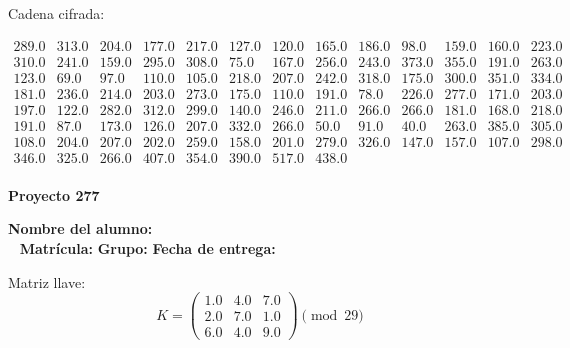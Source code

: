\documentclass[12pt]{article}
\begin{document}
Cadena cifrada:
\begin{center}
$\begin{array}{lllllllllllll}
289.0 & 313.0 & 204.0 & 177.0 & 217.0 & 127.0 & 120.0 & 165.0 & 186.0 & 98.0 & 159.0 & 160.0 & 223.0\\
310.0 & 241.0 & 159.0 & 295.0 & 308.0 & 75.0 & 167.0 & 256.0 & 243.0 & 373.0 & 355.0 & 191.0 & 263.0\\
123.0 & 69.0 & 97.0 & 110.0 & 105.0 & 218.0 & 207.0 & 242.0 & 318.0 & 175.0 & 300.0 & 351.0 & 334.0\\
181.0 & 236.0 & 214.0 & 203.0 & 273.0 & 175.0 & 110.0 & 191.0 & 78.0 & 226.0 & 277.0 & 171.0 & 203.0\\
197.0 & 122.0 & 282.0 & 312.0 & 299.0 & 140.0 & 246.0 & 211.0 & 266.0 & 266.0 & 181.0 & 168.0 & 218.0\\
191.0 & 87.0 & 173.0 & 126.0 & 207.0 & 332.0 & 266.0 & 50.0 & 91.0 & 40.0 & 263.0 & 385.0 & 305.0\\
108.0 & 204.0 & 207.0 & 202.0 & 259.0 & 158.0 & 201.0 & 279.0 & 326.0 & 147.0 & 157.0 & 107.0 & 298.0\\
346.0 & 325.0 & 266.0 & 407.0 & 354.0 & 390.0 & 517.0 & 438.0\\
\end{array}$
\end{center}

\newpage


\textbf{Proyecto 277}

\textbf{Nombre del alumno:} \underline{\hspace{13cm}}\\\
\vspace{1cm}
\textbf{Matrícula:} \underline{\hspace{4cm}} \hspace{1cm}
\textbf{Grupo:} \underline{\hspace{2cm}}
\textbf{Fecha de entrega:} \underline{\hspace{2cm}}

\medskip

Matriz llave:
\[
K = \begin{pmatrix}
1.0 & 4.0 & 7.0\\
2.0 & 7.0 & 1.0\\
6.0 & 4.0 & 9.0
\end{pmatrix} \pmod{29}
\]
\end{document}
